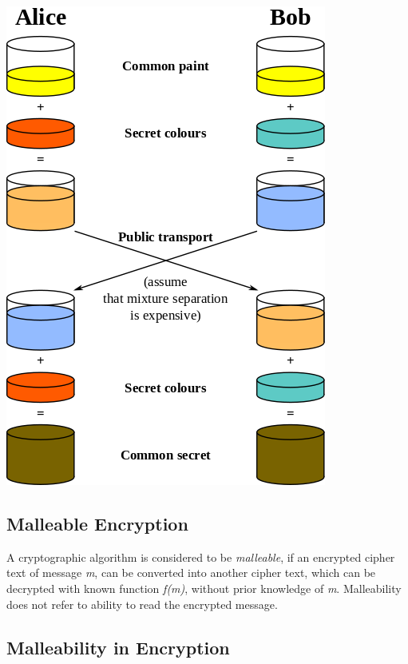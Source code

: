\documentclass[12pt]{article}
\begin{document}
\includegraphics{res/Diffie-Hellman_Key_Exchange.png}

%
%

\pagebreak
\vspace*{\fill}
\begin{center}
\section{Malleable Encryption}
A cryptographic algorithm is considered to be \textit{malleable}, if an encrypted cipher text of message \textit{m}, 
can be converted into another cipher text, which can be decrypted with known function \textit{f(m)}, without 
prior knowledge of \textit{m}. Malleability does not refer to ability to read the encrypted message. \\
\end{center}
\vspace*{\fill}
\pagebreak


\subsection{Malleability in Encryption}
\end{document}

